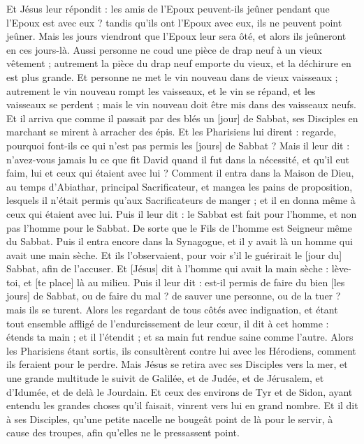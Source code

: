 \begin{multicols}{2}
Et Jésus leur répondit : les amis de l'Epoux peuvent-ils jeûner pendant que l'Epoux est avec eux ? tandis qu'ils ont l'Epoux avec eux, ils ne peuvent point jeûner.
Mais les jours viendront que l'Epoux leur sera ôté, et alors ils jeûneront en ces jours-là.
Aussi personne ne coud une pièce de drap neuf à un vieux vêtement ; autrement la pièce du drap neuf emporte du vieux, et la déchirure en est plus grande.
Et personne ne met le vin nouveau dans de vieux vaisseaux ; autrement le vin nouveau rompt les vaisseaux, et le vin se répand, et les vaisseaux se perdent ; mais le vin nouveau doit être mis dans des vaisseaux neufs.
Et il arriva que comme il passait par des blés un [jour] de Sabbat, ses Disciples en marchant se mirent à arracher des épis.
Et les Pharisiens lui dirent : regarde, pourquoi font-ils ce qui n'est pas permis les [jours] de Sabbat ?
Mais il leur dit : n'avez-vous jamais lu ce que fit David quand il fut dans la nécessité, et qu'il eut faim, lui et ceux qui étaient avec lui ?
Comment il entra dans la Maison de Dieu, au temps d'Abiathar, principal Sacrificateur, et mangea les pains de proposition, lesquels il n'était permis qu'aux Sacrificateurs de manger ; et il en donna même à ceux qui étaient avec lui.
Puis il leur dit : le Sabbat est fait pour l'homme, et non pas l'homme pour le Sabbat.
De sorte que le Fils de l'homme est Seigneur même du Sabbat.
\VerseOne{}Puis il entra encore dans la Synagogue, et il y avait là un homme qui avait une main sèche.
Et ils l'observaient, pour voir s'il le guérirait le [jour du] Sabbat, afin de l'accuser.
Et [Jésus] dit à l'homme qui avait la main sèche : lève-toi, et [te place] là au milieu.
Puis il leur dit : est-il permis de faire du bien [les jours] de Sabbat, ou de faire du mal ? de sauver une personne, ou de la tuer ? mais ils se turent.
Alors les regardant de tous côtés avec indignation, et étant tout ensemble affligé de l'endurcissement de leur cœur, il dit à cet homme : étends ta main ; et il l'étendit ; et sa main fut rendue saine comme l'autre.
Alors les Pharisiens étant sortis, ils consultèrent contre lui avec les Hérodiens, comment ils feraient pour le perdre.
Mais Jésus se retira avec ses Disciples vers la mer, et une grande multitude le suivit de Galilée, et de Judée, et de Jérusalem, et d'Idumée, et de delà le Jourdain.
Et ceux des environs de Tyr et de Sidon, ayant entendu les grandes choses qu'il faisait, vinrent vers lui en grand nombre.
Et il dit à ses Disciples, qu'une petite nacelle ne bougeât point de là pour le servir, à cause des troupes, afin qu'elles ne le pressassent point.

\end{multicols}
